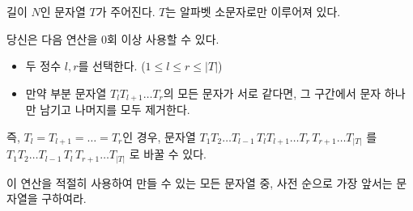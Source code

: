 길이 $N$인 문자열 $T$가 주어진다. $T$는 알파벳 소문자로만 이루어져 있다.

당신은 다음 연산을 $0$회 이상 사용할 수 있다.

\begin{itemize}
    \item 두 정수 $l, r$를 선택한다. ($1 \le l \le r \le |T|$)
    \item 만약 부분 문자열 $T_l T_{l+1} \dots T_r$의 모든 문자가 서로 같다면, 그 구간에서 문자 하나만 남기고 나머지를 모두 제거한다.
\end{itemize}

즉, $T_l = T_{l+1} = \dots = T_r$인 경우, 문자열
$ T_1 T_2 \dots T_{l-1}\, T_l T_{l+1} \dots T_r\, T_{r+1} \dots T_{|T|} $
를
$ T_1 T_2 \dots T_{l-1}\, T_l\, T_{r+1} \dots T_{|T|} $
로 바꿀 수 있다.

이 연산을 적절히 사용하여 만들 수 있는 모든 문자열 중, 사전 순으로 가장 앞서는 문자열을 구하여라.